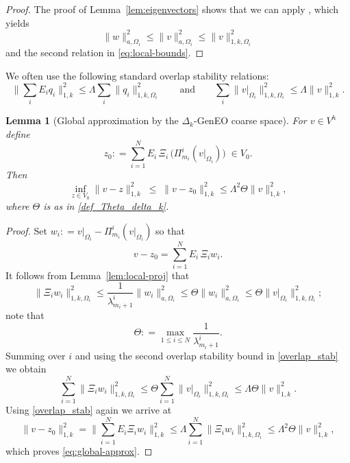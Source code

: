 \documentclass[preprint,3p,times]{elsarticle}
\newcommand{\assign}{\mathrel{\mathop:}=}
\newtheorem{lemma}[theorem]{Lemma}
\theoremstyle{definition}
\numberwithin{equation}{section}
\begin{document}
\begin{proof}
The proof of Lemma~\ref{lem:eigenvectors} shows that we can apply \cite[Lemma~3.15]{Bastian:2023:MSDD},
which yields
\[
	\|w\|_{{a,\Omega_i}}^2 \le \|v\|_{{a,\Omega_i}}^2 \le \|v\|_{1,k,\Omega_i}^2
\]
and the second relation in \eqref{eq:local-bounds}.
\end{proof}

We often use the following standard overlap stability relations:
\begin{equation}\label{overlap_stab}
	\bigg\| \sum_i E_i q_i \bigg\|_{1,k}^2 \le \Lambda \sum_i \|q_i\|_{1,k,\Omega_i}^2 \qquad\text{and}\qquad
	\sum_i \|v|_{\Omega_i}\|_{1,k,\Omega_i}^2 \le \Lambda \|v\|_{1,k}^2.
\end{equation}


\begin{lemma}[Global approximation by the $\Delta_k$-GenEO coarse space]
\label{lem:global-approx}
For $v\in V^h$ define
\[
	z_0 \assign \sum_{i=1}^N E_i\,\Xi_i \,\!\bigl(\Pi_{m_i}^i(v|_{\Omega_i})\bigr)\;\in V_0.
\]
Then
\begin{equation}\label{eq:global-approx}
	\inf_{z\in V_0}\|v-z\|_{1, k}^2 \;\le\; \|v-z_0\|_{1, k}^2
	\le \Lambda^2\Theta\|v\|_{1, k}^2,
\end{equation}
where $\Theta$ is as in \eqref{def_Theta_delta_k}.
\end{lemma}

\begin{proof}
Set $w_i\assign v|_{\Omega_i} - \Pi_{m_i}^i(v|_{\Omega_i})$ so that 
\[
	v-z_0 = \sum_{i=1}^N E_i\,\Xi_i w_i.
\]
It follows from Lemma~\ref{lem:local-proj} that
\[
	\|\Xi_i w_i\|_{1,k,\Omega_i}^2 \le \frac{1}{\lambda_{m_i+1}^i}\|w_i\|_{{a,\Omega_i}}^2
	\le \Theta\|w_i\|_{{a,\Omega_i}}^2
	\le \Theta\|v|_{\Omega_i}\|_{1,k,\Omega_i}^2;
\]
note that
\[
	\Theta \assign \max_{1\le i\le N}\frac{1}{\lambda_{m_i+1}^i}.
\]
Summing over $i$ and using the second overlap stability bound in \eqref{overlap_stab} we obtain
\begin{equation}\label{sum_norm_zi}
	\sum_{i=1}^N \|\Xi_i w_i\|_{1,k,\Omega_i}^2 
	\le \Theta \sum_{i=1}^N \|v|_{\Omega_i}\|_{1,k,\Omega_i}^2
	\le \Lambda\Theta \|v\|_{1,k}^2.
\end{equation}
Using \eqref{overlap_stab} again we arrive at
\[
	\|v-z_0\|_{1,k}^2 = \bigg\|\sum_{i=1}^N E_i\Xi_i w_i\bigg\|_{1,k}^2
	\le \Lambda \sum_{i=1}^N \|\Xi_i w_i\|_{1,k,\Omega_i}^2
	\le \Lambda^2\Theta \|v\|_{1,k}^2,
\]
which proves \eqref{eq:global-approx}.
\end{proof}
\end{document}
